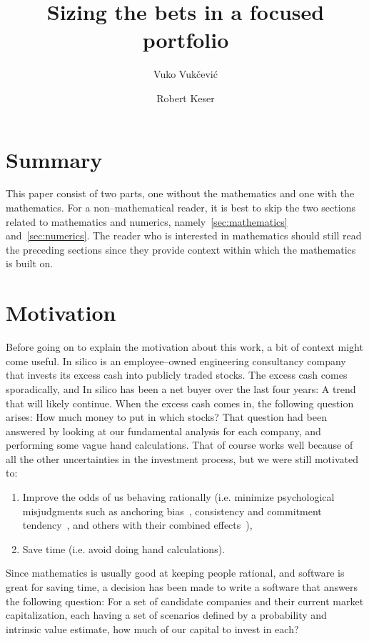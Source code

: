 \documentclass{article}
\title{Sizing the bets in a focused portfolio}
\author[$\dagger$]{Vuko Vuk\v{c}evi\'{c}}
\author[$\dagger$]{Robert Keser}
\affil[$\dagger$]{In silico Ltd., Zagreb, Croatia,\linebreak vuko.vukcevic@insilico.hr, robert.keser@insilico.hr}
\begin{document}
\maketitle

\section{Summary}
\label{sec:summary}

This paper consist of two parts, one without the mathematics and one with the
mathematics. For a non--mathematical reader, it is best to skip the two sections
related to mathematics and numerics, namely~\autoref{sec:mathematics}
and~\autoref{sec:numerics}. The reader who is interested in mathematics should
still read the preceding sections since they provide context within which the
mathematics is built on.

\section{Motivation}
\label{sec:motivation}

Before going on to explain the motivation about this work, a bit of context
might come useful. In silico is an employee--owned engineering consultancy
company that invests its excess cash into publicly traded stocks. The excess
cash comes sporadically, and In silico has been a net buyer over the last four
years: A trend that will likely continue. When the excess cash comes in, the
following question arises: How much money to put in which stocks? That question
had been answered by looking at our fundamental analysis for each company, and
performing some vague hand calculations. That of course works well because of
all the other uncertainties in the investment process, but we were still
motivated to:
\begin{enumerate}
    \item Improve the odds of us behaving rationally (i.e. minimize
    psychological misjudgments such as anchoring bias~\cite{kahneman},
    consistency and commitment tendency~\cite{cialdini}, and
    others with their combined effects~\cite{almanack}),
    \item Save time (i.e. avoid doing hand calculations).
\end{enumerate}

Since mathematics is usually good at keeping people rational, and software is
great for saving time, a decision has been made to write a software that answers
the following question: For a set of candidate companies and their current
market capitalization, each having a set of scenarios defined by a probability
and intrinsic value estimate, how much of our capital to invest in each?
\end{document}
